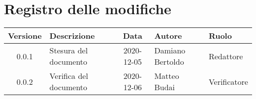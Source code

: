 \section*{Registro delle modifiche}

\begin{center}
	\begin{longtable}{|c|p{3.5cm}|c|p{3.1cm}|p{3cm}|}
	\hline
	\rowcolor{lighter-grayer}
	\textbf{Versione} & \textbf{Descrizione} & \textbf{Data} & \textbf{Autore} & \textbf{Ruolo} \\
	\hline
	\endfirsthead

	0.0.1 & Stesura del documento & 2020-12-05 & Damiano Bertoldo & Redattore \\
	0.0.2 & Verifica del documento & 2020-12-06 & Matteo Budai & Verificatore \\
	\hline

	\end{longtable}
\end{center}
